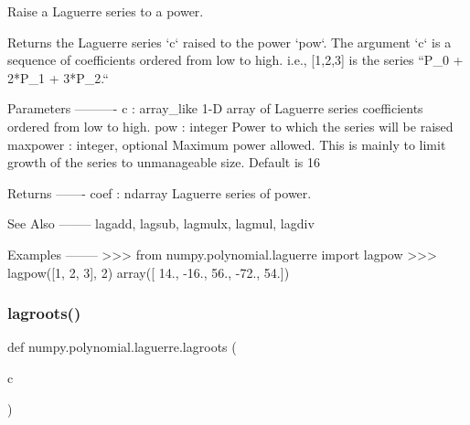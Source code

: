 \begin{DoxyVerb}Raise a Laguerre series to a power.

Returns the Laguerre series `c` raised to the power `pow`. The
argument `c` is a sequence of coefficients ordered from low to high.
i.e., [1,2,3] is the series  ``P_0 + 2*P_1 + 3*P_2.``

Parameters
----------
c : array_like
    1-D array of Laguerre series coefficients ordered from low to
    high.
pow : integer
    Power to which the series will be raised
maxpower : integer, optional
    Maximum power allowed. This is mainly to limit growth of the series
    to unmanageable size. Default is 16

Returns
-------
coef : ndarray
    Laguerre series of power.

See Also
--------
lagadd, lagsub, lagmulx, lagmul, lagdiv

Examples
--------
>>> from numpy.polynomial.laguerre import lagpow
>>> lagpow([1, 2, 3], 2)
array([ 14., -16.,  56., -72.,  54.])\end{DoxyVerb}
 \mbox{\label{namespacenumpy_1_1polynomial_1_1laguerre_aec765526a8f733a4f6d6ae9bdfb982d2}} 
\subsubsection{\texorpdfstring{lagroots()}{lagroots()}}
{\footnotesize\ttfamily def numpy.\+polynomial.\+laguerre.\+lagroots (\begin{DoxyParamCaption}\item[{}]{c }\end{DoxyParamCaption})}


